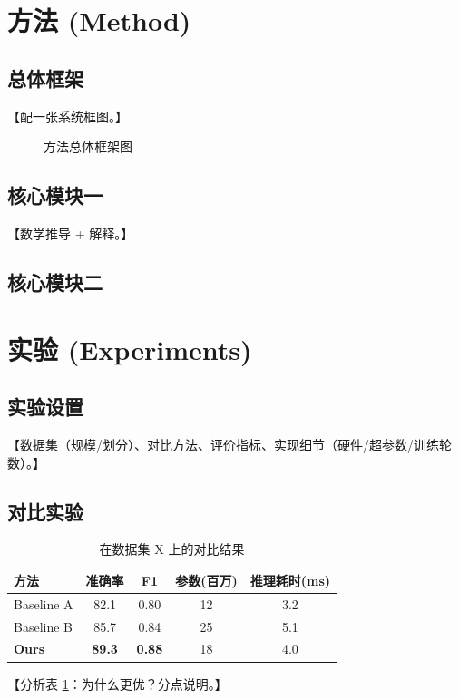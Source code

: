 \documentclass[12pt,a4paper]{article}
\begin{document}
\section{方法 (Method)}
\subsection{总体框架}
【配一张系统框图。】
\begin{figure}[htbp]
    \centering
    \caption{方法总体框架图}
    \label{fig:framework}
\end{figure}

\subsection{核心模块一}
【数学推导 + 解释。】
\subsection{核心模块二}

\section{实验 (Experiments)}
\subsection{实验设置}
【数据集（规模/划分）、对比方法、评价指标、实现细节（硬件/超参数/训练轮数）。】
\subsection{对比实验}
\begin{table}[htbp]
    \centering
    \caption{在数据集 X 上的对比结果}
    \label{tab:comparison}
    \begin{tabular}{lcccc}
        \toprule
        \textbf{方法} & \textbf{准确率} & \textbf{F1} & \textbf{参数(百万)} & \textbf{推理耗时(ms)} \\
        \midrule
        Baseline A & 82.1 & 0.80 & 12 & 3.2 \\
        Baseline B & 85.7 & 0.84 & 25 & 5.1 \\
        \textbf{Ours} & \textbf{89.3} & \textbf{0.88} & 18 & 4.0 \\
        \bottomrule
    \end{tabular}
\end{table}
【分析表 \ref{tab:comparison}：为什么更优？分点说明。】
\end{document}

